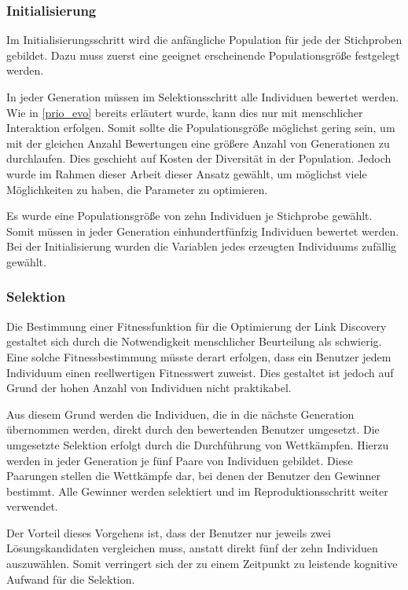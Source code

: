 \subsubsection{Initialisierung}

Im Initialisierungsschritt wird die anfängliche Population für jede der Stichproben gebildet. Dazu muss zuerst eine geeignet erscheinende Populationsgröße festgelegt werden.

In jeder Generation müssen im Selektionsschritt alle Individuen bewertet werden. Wie in \cref{prio_evo} bereits erläutert wurde, kann dies nur mit menschlicher Interaktion erfolgen. Somit sollte die Populationsgröße möglichst gering sein, um mit der gleichen Anzahl Bewertungen eine größere Anzahl von Generationen zu durchlaufen. Dies geschieht auf Kosten der Diversität in der Population. Jedoch wurde im Rahmen dieser Arbeit dieser Ansatz gewählt, um möglichst viele Möglichkeiten zu haben, die Parameter zu optimieren.

Es wurde eine Populationsgröße von zehn Individuen je Stichprobe gewählt. Somit müssen in jeder Generation einhundertfünfzig Individuen bewertet werden. Bei der Initialisierung wurden die Variablen jedes erzeugten Individuums zufällig gewählt.

\subsubsection{Selektion}

Die Bestimmung einer Fitnessfunktion für die Optimierung der Link Discovery gestaltet sich durch die Notwendigkeit menschlicher Beurteilung als schwierig. Eine solche Fitnessbestimmung müsste derart erfolgen, dass ein Benutzer jedem Individuum einen reellwertigen Fitnesswert zuweist. Dies gestaltet ist jedoch auf Grund der hohen Anzahl von Individuen nicht praktikabel.

Aus diesem Grund werden die Individuen, die in die nächste Generation übernommen werden, direkt durch den bewertenden Benutzer umgesetzt. Die umgesetzte Selektion erfolgt durch die Durchführung von Wettkämpfen. Hierzu werden in jeder Generation je fünf Paare von Individuen gebildet. Diese Paarungen stellen die Wettkämpfe dar, bei denen der Benutzer den Gewinner bestimmt. Alle Gewinner werden selektiert und im Reproduktionsschritt weiter verwendet.

Der Vorteil dieses Vorgehens ist, dass der Benutzer nur jeweils zwei Lösungskandidaten vergleichen muss, anstatt direkt fünf der zehn Individuen auszuwählen. Somit verringert sich der zu einem Zeitpunkt zu leistende kognitive Aufwand für die Selektion.

